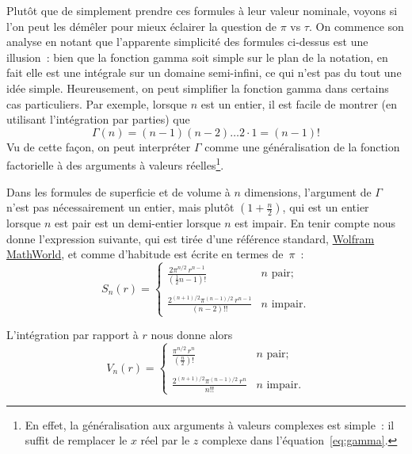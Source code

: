 Plutôt que de simplement prendre ces formules à leur valeur nominale,
voyons si l'on peut les démêler pour mieux éclairer la question de $\pi$ vs
$\tau$. On commence son analyse en notant que l'apparente simplicité des
formules ci-dessus est une illusion~: bien que la fonction gamma soit simple sur
le plan de la notation, en fait elle est une intégrale sur un domaine
semi-infini, ce qui n'est pas du tout une idée simple. Heureusement, on peut
simplifier la fonction gamma dans certains cas particuliers. Par exemple,
lorsque $n$ est un entier, il est facile de montrer (en utilisant l'intégration
par parties) que
\[
\Gamma(n) = (n-1)(n-2)\ldots 2\cdot 1 = (n-1)!
\]
Vu de cette façon, on peut interpréter $\Gamma$ comme une généralisation de la
fonction factorielle à des arguments à valeurs réelles\ns\footnote{En effet, la
généralisation aux arguments à valeurs complexes est simple~: il suffit de
remplacer le $x$ réel par le $z$ complexe dans l'équation~\eqref{eq:gamma}.}.

Dans les formules de superficie et de volume à $n$ dimensions, l'argument de
$\Gamma$ n'est pas nécessairement un entier, mais plutôt $\left(1 +
\frac{n}{2}\right)$, qui est un entier lorsque $n$ est pair est un demi-entier
lorsque $n$ est impair. En tenir compte nous donne l'expression suivante, qui est
tirée d'une référence standard,
\href{https://mathworld.wolfram.com/Hypersphere.html}{Wolfram MathWorld}, et
comme d'habitude est écrite en termes de~$\pi$~:
\begin{equation}
\label{eq:surface_area_mathworld}
S_n(r) = \begin{cases}
\displaystyle \frac{2\pi^{n/2}\,r^{n-1}}{(\frac{1}{2}n - 1)!} & n \text{ pair}; \\ \\
 \displaystyle \frac{2^{(n+1)/2}\pi^{(n-1)/2}\,r^{n-1}}{(n-2)!!} & n \text{ impair}.
\end{cases}
\end{equation}

L'intégration par rapport à $r$ nous donne alors
\begin{equation}
\label{eq:volume_mathworld}
V_n(r) = \begin{cases}
\displaystyle \frac{\pi^{n/2}\,r^n}{(\frac{n}{2})!} & n \text{ pair}; \\ \\
\displaystyle \frac{2^{(n+1)/2}\pi^{(n-1)/2}\,r^n}{n!!} & n \text{ impair}.
\end{cases}
\end{equation}

